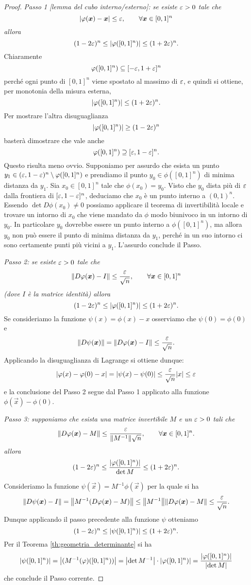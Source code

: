 \begin{proof}
\emph{Passo 1 [lemma del cubo interno/esterno]: 
se esiste $\varepsilon>0$ tale che 
\[
  {\left|\varphi(\boldsymbol x)-\boldsymbol x\right|} \le \varepsilon, \qquad \forall \boldsymbol x \in [0,1]^n
\]
allora 
\[
  (1-2\varepsilon)^n
  \le {\left|\varphi([0,1]^n)\right|}
  \le (1+2\varepsilon)^n.
\]
}
Chiaramente 
\[
    \varphi([0,1]^n) \subseteq [-\varepsilon,1+\varepsilon]^n
\]
perché ogni punto di $[0,1]^n$ viene spostato al massimo di $\varepsilon$, 
e quindi si ottiene, per monotonia della misura esterna,
\[
    {\left|\varphi([0,1]^n)\right|} \le (1+2\varepsilon)^n.
\]
Per mostrare l'altra disuguaglianza  
\[
   {\left|\varphi([0,1]^n)\right|} \ge (1-2\varepsilon)^n
\]
basterà dimostrare che vale anche 
\[
  \varphi([0,1]^n) \supseteq [\varepsilon,1-\varepsilon]^n.
\]
Questo risulta meno ovvio.
Supponiamo per assurdo che esista un punto $y_1 \in (\varepsilon,1-\varepsilon)^n \setminus \varphi([0,1]^n)$ 
e prendiamo il punto $y_0\in \phi([0,1]^n)$ di minima distanza da $y_1$.
Sia $x_0\in [0,1]^n$ tale che $\phi(x_0)=y_0$.
Visto che $y_0$ dista più di $\varepsilon$ dalla frontiera di $[\varepsilon,1-\varepsilon]^n$, 
deduciamo che $x_0$ è un punto interno a $(0,1)^n$. 
Essendo $\det D\phi(x_0)\neq 0$ possiamo applicare il teorema di invertibilità locale 
e trovare un intorno di $x_0$ che viene mandato da $\phi$ modo biunivoco in un intorno di $y_0$.
In particolare $y_0$ dovrebbe essere un punto interno a $\phi([0,1]^n)$, ma allora 
$y_0$ non può essere il punto di minima distanza da $y_1$, perché in un suo intorno ci sono 
certamente punti più vicini a $y_1$. L'assurdo conclude il Passo.

\emph{Passo 2: se esiste $\varepsilon>0$ tale che 
\[
  {\left\Vert  D\varphi(\boldsymbol x) - I\right\Vert} \le \frac{\varepsilon}{\sqrt n}, \qquad \forall \boldsymbol x \in [0,1]^n
\]
(dove $I$ è la matrice identità)
allora
\[
 (1-2\varepsilon)^n \le {\left|\varphi([0,1]^n)\right|} \le (1+2\varepsilon)^n.
\]
}
Se consideriamo la funzione $\psi(x) = \phi(x) - x$ osserviamo che $\psi(0)=\phi(0)$ e
\[
{\left\Vert D\psi(\boldsymbol x)\right\Vert} = {\left\Vert D\varphi(\boldsymbol x) -I\right\Vert} \le \frac{\varepsilon}{\sqrt n}.
\]
Applicando la disuguaglianza di Lagrange si ottiene dunque:
\[
{\left|\varphi(x) - \varphi(0) - x\right|} = {\left|\psi(x)-\psi(0)\right|} \le \frac {\varepsilon} {\sqrt n} {\left|x\right|} \le \varepsilon
\]
e la conclusione del Passo 2 segue dal Passo 1 applicato alla funzione $\phi(\vec x) - \phi(0)$.

\emph{Passo 3: supponiamo che esista una matrice invertibile $M$ e un $\varepsilon>0$ tali che
\[
  {\left\Vert D\varphi(\boldsymbol x) - M\right\Vert} \le \frac{\varepsilon}{{\left\Vert M^{-1}\right\Vert} \sqrt n}, \qquad \forall \boldsymbol x \in [0,1]^n.
\]
allora
\[
(1-2\varepsilon)^n \le \frac{{\left|\varphi([0,1]^n)\right|}}{\det M} \le (1+2\varepsilon)^n.
\]}

Consideriamo la funzione $\psi(\vec x) = M^{-1} \phi(\vec x)$ per la quale si ha  
\[
  {\left\Vert D\psi(\boldsymbol x)-I\right\Vert} 
  = {\left\Vert M^{-1} (D\varphi(\boldsymbol x)-M)\right\Vert} 
  \le {\left\Vert M^{-1}\right\Vert} {\left\Vert D\varphi(\boldsymbol x)-M\right\Vert}
  \le \frac{\varepsilon}{\sqrt n}.
\]
Dunque applicando il passo precedente alla funzione $\psi$ otteniamo 
\[
(1-2\varepsilon)^n \le {\left|\psi([0,1]^n)\right|} \le (1+2\varepsilon)^n.
\]
Per il Teorema \ref{th:geometria_determinante} si ha
\[
  {\left|\psi([0,1]^n)\right|} = {\left|(M^{-1}(\varphi)([0,1]^n))\right|}
  = {\left|\det M^{-1}\right|} \cdot {\left|\varphi([0,1]^n)\right|}
  = \frac{{\left|\varphi([0,1]^n)\right|}}{{\left|\det M\right|}}
\]
che conclude il Passo corrente.
\end{proof}


